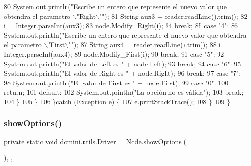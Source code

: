 \begin{DoxyCode}
80                     System.out.println(\textcolor{stringliteral}{"Escribe un entero que represente el nuevo valor que obtendra el
       parametro \(\backslash\)"Right\(\backslash\)""});
81                     String aux3 = reader.readLine().trim();
82                     i = Integer.parseInt(aux3);
83                     node.Modify\_Right(i);
84                 \textcolor{keywordflow}{break};
85                 \textcolor{keywordflow}{case} \textcolor{stringliteral}{"4"}:
86                     System.out.println(\textcolor{stringliteral}{"Escribe un entero que represente el nuevo valor que obtendra el
       parametro \(\backslash\)"First\(\backslash\)""});
87                     String aux4 = reader.readLine().trim();
88                     i = Integer.parseInt(aux4);
89                     node.Modify\_First(i);
90                 \textcolor{keywordflow}{break};
91                 \textcolor{keywordflow}{case} \textcolor{stringliteral}{"5"}:
92                     System.out.println(\textcolor{stringliteral}{"El valor de Left es "} + node.Left);
93                 \textcolor{keywordflow}{break};
94                 \textcolor{keywordflow}{case} \textcolor{stringliteral}{"6"}:
95                     System.out.println(\textcolor{stringliteral}{"El valor de Right es "} + node.Right);
96                 \textcolor{keywordflow}{break};
97                 \textcolor{keywordflow}{case} \textcolor{stringliteral}{"7"}:
98                     System.out.println(\textcolor{stringliteral}{"El valor de First es "} + node.First);
99                 \textcolor{keywordflow}{case} \textcolor{stringliteral}{"0"}:
100                     \textcolor{keywordflow}{return};
101                 \textcolor{keywordflow}{default}:
102                     System.out.println(\textcolor{stringliteral}{"La opción no es válida"});
103                 \textcolor{keywordflow}{break};
104             \}
105         \}
106     \}\textcolor{keywordflow}{catch} (Exception e) \{
107         e.printStackTrace();
108     \}
109     \}
\end{DoxyCode}
\mbox{\label{classdomini_1_1utils_1_1Driver____Node_a3e1022f470676f7cbbeb44b9b2d4f66f}} 
\subsubsection{\texorpdfstring{show\+Options()}{showOptions()}}
{\footnotesize\ttfamily private static void domini.\+utils.\+Driver\+\_\+\+\_\+\+Node.\+show\+Options (\begin{DoxyParamCaption}{ }\end{DoxyParamCaption})\hspace{0.3cm}{\ttfamily [inline]}, {\ttfamily [static]}, {\ttfamily [private]}}



